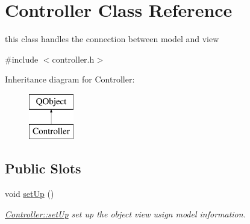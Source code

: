 \hypertarget{class_controller}{}\section{Controller Class Reference}
\label{class_controller}


this class handles the connection between model and view  




{\ttfamily \#include $<$controller.\+h$>$}

Inheritance diagram for Controller\+:\begin{figure}[H]
\begin{center}
\leavevmode
\includegraphics[height=2.000000cm]{class_controller}
\end{center}
\end{figure}
\subsection*{Public Slots}
\begin{DoxyCompactItemize}
\item 
\mbox{\label{class_controller_ac5b5525e1a9fc6914657dd8d943a0928}} 
void \hyperlink{class_controller_ac5b5525e1a9fc6914657dd8d943a0928}{set\+Up} ()
\begin{DoxyCompactList}\small\item\em \hyperlink{class_controller_ac5b5525e1a9fc6914657dd8d943a0928}{Controller\+::set\+Up} set up the object view usign model information. \end{DoxyCompactList}\end{DoxyCompactItemize}
